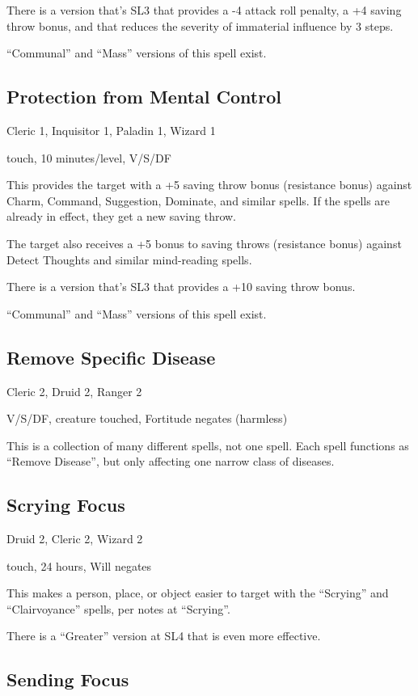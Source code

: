 There is a version that's SL3 that provides a -4 attack roll penalty, a
+4 saving throw bonus, and that reduces the severity of immaterial
influence by 3 steps.

``Communal'' and ``Mass'' versions of this spell exist.
%

%
\subsection{Protection from Mental Control}

Cleric 1, Inquisitor 1, Paladin 1, Wizard 1

touch, 10 minutes/level, V/S/DF

This provides the target with a +5 saving throw bonus (resistance bonus)
against Charm, Command, Suggestion, Dominate, and similar spells. If the
spells are already in effect, they get a new saving throw.

The target also receives a +5 bonus to saving throws (resistance bonus)
against Detect Thoughts and similar mind-reading spells.

There is a version that's SL3 that provides a +10 saving throw bonus.

``Communal'' and ``Mass'' versions of this spell exist.
%

%
\subsection{Remove Specific Disease}

Cleric 2, Druid 2, Ranger 2

V/S/DF, creature touched, Fortitude negates (harmless)

This is a collection of many different spells, not one spell. Each spell
functions as ``Remove Disease'', but only affecting one narrow class of
diseases.
%

%
\subsection{Scrying Focus}

Druid 2, Cleric 2, Wizard 2

touch, 24 hours, Will negates

This makes a person, place, or object easier to target with the ``Scrying''
and ``Clairvoyance'' spells, per notes at ``Scrying''.

There is a ``Greater'' version at SL4 that is even more effective.
%

%
\subsection{Sending Focus}

